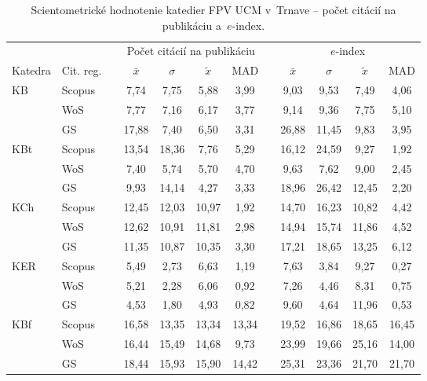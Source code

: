 \begin{table}
  \centering\small
  \caption[Hodnotenie FPV -- počet citácií na publikáciu a $e$-index]%
  {Scientometrické hodnotenie katedier FPV UCM v~Trnave -- počet citácií na
    publikáciu a~$e$-index.}
  \label{tab:2-staff.results}
  \begin{tabularx}{\textwidth}{XXp{1ex}ccccp{1ex}cccc}
    \toprule
    & & &\multicolumn{4}{c}{Počet citácií na publikáciu} & &\multicolumn{4}{c}{$e$-index} \\
    \cmidrule{4-7}\cmidrule{9-12}
    Katedra  & Cit. reg. & & $\bar{x}$ & $\sigma$  & $\tilde{x}$ & MAD & & $\bar{x}$ & $\sigma$ & $\tilde{x}$  & MAD \\
    \midrule
    KB   & Scopus & & 7,74  & 7,75  & 5,88  & 3,99  & & 9,03  & 9,53  & 7,49  & 4,06  \\
         & WoS    & & 7,77  & 7,16  & 6,17  & 3,77  & & 9,14  & 9,36  & 7,75  & 5,10  \\
         & GS     & & 17,88 & 7,40  & 6,50  & 3,31  & & 26,88 & 11,45 & 9,83  & 3,95  \\[1ex]
    KBt  & Scopus & & 13,54 & 18,36 & 7,76  & 5,29  & & 16,12 & 24,59 & 9,27  & 1,92  \\
         & WoS    & & 7,40  & 5,74  & 5,70  & 4,70  & & 9,63  & 7,62  & 9,00  & 2,45  \\
         & GS     & & 9,93  & 14,14 & 4,27  & 3,33  & & 18,96 & 26,42 & 12,45 & 2,20  \\[1ex]
    KCh  & Scopus & & 12,45 & 12,03 & 10,97 & 1,92  & & 14,70 & 16,23 & 10,82 & 4,42  \\
         & WoS    & & 12,62 & 10,91 & 11,81 & 2,98  & & 14,94 & 15,74 & 11,86 & 4,52  \\
         & GS     & & 11,35 & 10,87 & 10,35 & 3,30  & & 17,21 & 18,65 & 13,25 & 6,12  \\[1ex]
    KER  & Scopus & & 5,49  & 2,73  & 6,63  & 1,19  & & 7,63  & 3,84  & 9,27  & 0,27  \\
         & WoS    & & 5,21  & 2,28  & 6,06  & 0,92  & & 7,26  & 4,46  & 8,31  & 0,75  \\
         & GS     & & 4,53  & 1,80  & 4,93  & 0,82  & & 9,60  & 4,64  & 11,96 & 0,53  \\[1ex]
    KBf  & Scopus & & 16,58 & 13,35 & 13,34 & 13,34 & & 19,52 & 16,86 & 18,65 & 16,45 \\
         & WoS    & & 16,44 & 15,49 & 14,68 & 9,73  & & 23,99 & 19,66 & 25,16 & 14,00 \\
         & GS     & & 18,44 & 15,93 & 15,90 & 14,42 & & 25,31 & 23,36 & 21,70 & 21,70 \\[1ex]

\end{tabularx}
\end{table}
